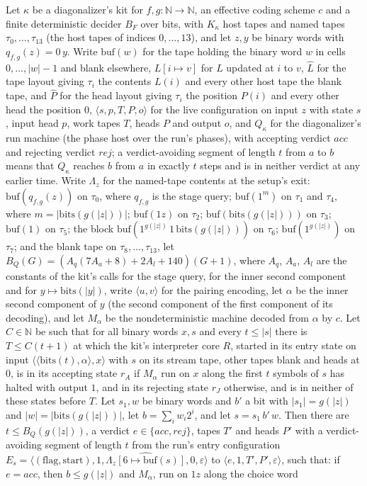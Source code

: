 \begin{theorem}
Let $\kappa$ be a diagonalizer's kit for $f, g : \mathbb{N} \to \mathbb{N}$, an effective coding scheme $c$ and a finite deterministic decider $B_F$ over bits, with $K_\kappa$ host tapes and named tapes $\tau_0, \dots, \tau_{13}$ (the host tapes of indices $0, \dots, 13$), and let $z, y$ be binary words with $q_{f,g}(z) = 0\,y$. Write $\mathrm{buf}(w)$ for the tape holding the binary word $w$ in cells $0, \dots, |w| - 1$ and blank elsewhere, $L[i \mapsto v]$ for $L$ updated at $i$ to $v$, $\hat L$ for the tape layout giving $\tau_i$ the contents $L(i)$ and every other host tape the blank tape, and $\hat P$ for the head layout giving $\tau_i$ the position $P(i)$ and every other head the position $0$, $\langle s, p, T, P, o\rangle$ for the live configuration on input $z$ with state $s$, input head $p$, work tapes $T$, heads $P$ and output $o$, and $Q_\kappa$ for the diagonalizer's run machine (the phase host over the run's phases), with accepting verdict $\mathit{acc}$ and rejecting verdict $\mathit{rej}$; a verdict-avoiding segment of length $t$ from $a$ to $b$ means that $Q_\kappa$ reaches $b$ from $a$ in exactly $t$ steps and is in neither verdict at any earlier time. Write $\Lambda_z$ for the named-tape contents at the setup's exit: $\mathrm{buf}(q_{f,g}(z))$ on $\tau_0$, where $q_{f,g}$ is the stage query; $\mathrm{buf}(1^m)$ on $\tau_1$ and $\tau_4$, where $m = |\mathrm{bits}(g(|z|))|$; $\mathrm{buf}(1z)$ on $\tau_2$; $\mathrm{buf}(\mathrm{bits}(g(|z|)))$ on $\tau_3$; $\mathrm{buf}(1)$ on $\tau_5$; the block $\mathrm{buf}(1^{g(|z|)}\,1\,\mathrm{bits}(g(|z|)))$ on $\tau_6$; $\mathrm{buf}(1^{g(|z|)})$ on $\tau_7$; and the blank tape on $\tau_8, \dots, \tau_{13}$, let $B_Q(G) = (A_q(7A_a + 8) + 2A_l + 140)(G + 1)$, where $A_q$, $A_a$, $A_l$ are the constants of the kit's calls for the stage query, for the inner second component and for $y \mapsto \mathrm{bits}(|y|)$, write $\langle u, v\rangle$ for the pairing encoding, let $\alpha$ be the inner second component of $y$ (the second component of the first component of its decoding), and let $M_\alpha$ be the nondeterministic machine decoded from $\alpha$ by $c$. Let $C \in \mathbb{N}$ be such that for all binary words $x, s$ and every $t \le |s|$ there is $T \le C(t + 1)$ at which the kit's interpreter core $R$, started in its entry state on input $\langle\langle \mathrm{bits}(t), \alpha\rangle, x\rangle$ with $s$ on its stream tape, other tapes blank and heads at $0$, is in its accepting state $r_A$ if $M_\alpha$ run on $x$ along the first $t$ symbols of $s$ has halted with output $1$, and in its rejecting state $r_J$ otherwise, and is in neither of these states before $T$. Let $s_1, w$ be binary words and $b'$ a bit with $|s_1| = g(|z|)$ and $|w| = |\mathrm{bits}(g(|z|))|$, let $b = \sum_i w_i 2^i$, and let $s = s_1\,b'\,w$. Then there are $t \le B_Q(g(|z|))$, a verdict $e \in \{\mathit{acc}, \mathit{rej}\}$, tapes $T'$ and heads $P'$ with a verdict-avoiding segment of length $t$ from the run's entry configuration $E_s = \langle (\text{flag}, \text{start}), 1, \widehat{\Lambda_z[6 \mapsto \mathrm{buf}(s)]}, 0, \varepsilon\rangle$ to $\langle e, 1, T', P', \varepsilon\rangle$, such that: if $e = \mathit{acc}$, then $b \le g(|z|)$ and $M_\alpha$, run on $1z$ along the choice word 
\end{theorem}
